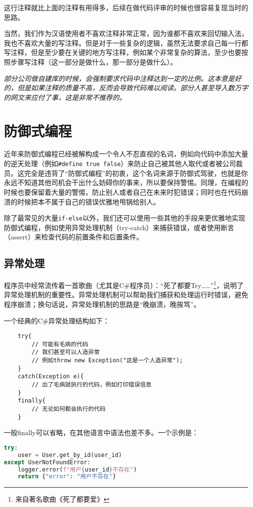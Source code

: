 \documentclass[../main.tex]{subfiles}
\begin{document}
这行注释就比上面的注释有用得多，后续在做代码评审的时候也很容易复现当时的思路。

当然，我们作为汉语使用者不喜欢注释非常正常，因为谁都不喜欢来回切输入法，我也不喜欢大量的写注释。但是对于一些复杂的逻辑，虽然无法要求自己每一行都写注释，但是至少要在关键的地方写注释，例如某个非常复杂的算法，至少也要按照步骤写注释（这一部分是做什么，那一部分是做什么）。

\emph{部分公司做自建库的时候，会强制要求代码中注释达到一定的比例。这本意是好的，但是如果注释的质量不高，反而会导致代码难以阅读。部分人甚至导入数万字的网文来应付了事，这是非常不推荐的。}

\section{防御式编程}

近年来防御式编程已经被解构成一个令人不忍直视的名词，例如向代码中添加大量的逆天处理（例如\texttt{\#define true false}）来防止自己被其他人取代或者被公司裁员。这完全是违背了“防御式编程”的初衷，这个名词来源于防御式驾驶，也就是你永远不知道其他司机会干出什么妨碍你的事来，所以要保持警惕。同理，在编程的时候也要保留着大量的警惕，防止别人或者自己在未来时犯错误；同时也在代码崩溃的时候把本不属于自己的错误优雅地甩锅给别人。

除了最常见的大量\texttt{if-else}以外，我们还可以使用一些其他的手段来更优雅地实现防御式编程，例如使用异常处理机制（try-catch）来捕获错误，或者使用断言（assert）来检查代码的前置条件和后置条件。

\subsection{异常处理}

程序员中经常流传着一首歌曲（尤其是C\#程序员）：“死了都要Try……”\footnote{来自著名歌曲《死了都要爱》}，说明了异常处理机制的重要性。异常处理机制可以帮助我们捕获和处理运行时错误，避免程序崩溃；换句话说，异常处理机制的思路是“晚崩溃，晚挨骂”。

一个经典的C\#异常处理结构如下：
\begin{lstlisting}
    try{
        // 可能有毛病的代码
        // 我们甚至可以人造异常
        // 例如throw new Exception("这是一个人造异常");
    }
    catch(Exception e){
        // 出了毛病就执行的代码，例如打印错误信息
    }
    finally{
        // 无论如何都会执行的代码
    }
\end{lstlisting}

一般finally可以省略，在其他语言中语法也差不多。一个示例是：
\begin{lstlisting}[language=Python]
try:
    user = User.get_by_id(user_id)
except UserNotFoundError:
    logger.error(f"用户{user_id}不存在")
    return {"error": "用户不存在"}
\end{lstlisting}
\end{document}
